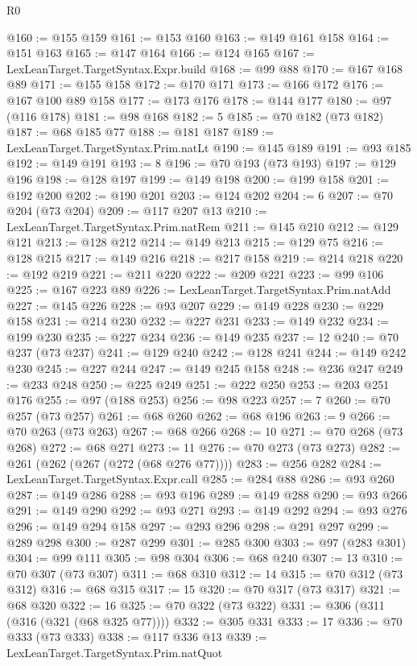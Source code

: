 \begin{lexlean}{R0}
\begin{coremodule}
@160 := @155 @159
@161 := @153 @160
@163 := @149 @161 @158
@164 := @151 @163
@165 := @147 @164
@166 := @124 @165
@167 := LexLeanTarget.TargetSyntax.Expr.build
@168 := @99 @88
@170 := @167 @168 @89
@171 := @155 @158
@172 := @170 @171
@173 := @166 @172
@176 := @167 @100 @89 @158
@177 := @173 @176
@178 := @144 @177
@180 := @97 (@116 @178)
@181 := @98 @168
@182 := 5
@185 := @70 @182 (@73 @182)
@187 := @68 @185 @77
@188 := @181 @187
@189 := LexLeanTarget.TargetSyntax.Prim.natLt
@190 := @145 @189
@191 := @93 @185
@192 := @149 @191
@193 := 8
@196 := @70 @193 (@73 @193)
@197 := @129 @196
@198 := @128 @197
@199 := @149 @198
@200 := @199 @158
@201 := @192 @200
@202 := @190 @201
@203 := @124 @202
@204 := 6
@207 := @70 @204 (@73 @204)
@209 := @117 @207 @13
@210 := LexLeanTarget.TargetSyntax.Prim.natRem
@211 := @145 @210
@212 := @129 @121
@213 := @128 @212
@214 := @149 @213
@215 := @129 @75
@216 := @128 @215
@217 := @149 @216
@218 := @217 @158
@219 := @214 @218
@220 := @192 @219
@221 := @211 @220
@222 := @209 @221
@223 := @99 @106
@225 := @167 @223 @89
@226 := LexLeanTarget.TargetSyntax.Prim.natAdd
@227 := @145 @226
@228 := @93 @207
@229 := @149 @228
@230 := @229 @158
@231 := @214 @230
@232 := @227 @231
@233 := @149 @232
@234 := @199 @230
@235 := @227 @234
@236 := @149 @235
@237 := 12
@240 := @70 @237 (@73 @237)
@241 := @129 @240
@242 := @128 @241
@244 := @149 @242 @230
@245 := @227 @244
@247 := @149 @245 @158
@248 := @236 @247
@249 := @233 @248
@250 := @225 @249
@251 := @222 @250
@253 := @203 @251 @176
@255 := @97 (@188 @253)
@256 := @98 @223
@257 := 7
@260 := @70 @257 (@73 @257)
@261 := @68 @260
@262 := @68 @196
@263 := 9
@266 := @70 @263 (@73 @263)
@267 := @68 @266
@268 := 10
@271 := @70 @268 (@73 @268)
@272 := @68 @271
@273 := 11
@276 := @70 @273 (@73 @273)
@282 := @261 (@262 (@267 (@272 (@68 @276 @77))))
@283 := @256 @282
@284 := LexLeanTarget.TargetSyntax.Expr.call
@285 := @284 @88
@286 := @93 @260
@287 := @149 @286
@288 := @93 @196
@289 := @149 @288
@290 := @93 @266
@291 := @149 @290
@292 := @93 @271
@293 := @149 @292
@294 := @93 @276
@296 := @149 @294 @158
@297 := @293 @296
@298 := @291 @297
@299 := @289 @298
@300 := @287 @299
@301 := @285 @300
@303 := @97 (@283 @301)
@304 := @99 @111
@305 := @98 @304
@306 := @68 @240
@307 := 13
@310 := @70 @307 (@73 @307)
@311 := @68 @310
@312 := 14
@315 := @70 @312 (@73 @312)
@316 := @68 @315
@317 := 15
@320 := @70 @317 (@73 @317)
@321 := @68 @320
@322 := 16
@325 := @70 @322 (@73 @322)
@331 := @306 (@311 (@316 (@321 (@68 @325 @77))))
@332 := @305 @331
@333 := 17
@336 := @70 @333 (@73 @333)
@338 := @117 @336 @13
@339 := LexLeanTarget.TargetSyntax.Prim.natQuot

\end{coremodule}
\end{lexlean}
